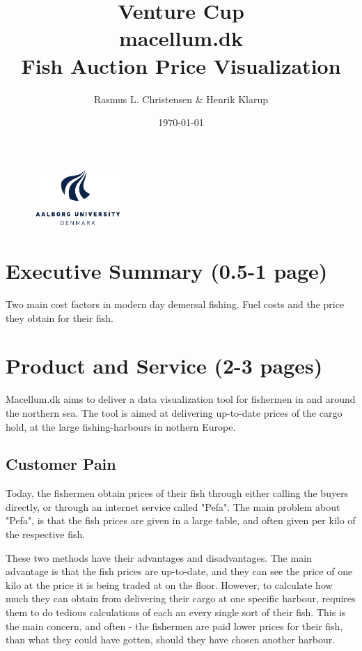 \documentclass[a4paper,10pt,oneside,fleqn]{article}
\begin{document}
\author{Rasmus L. Christensen \& Henrik Klarup}
\title{Venture Cup\\
macellum.dk\\
Fish Auction Price Visualization}
\date{\today}
\maketitle
\begin{centering}
\begin{figure}[htpb]
	\centering
	\includegraphics[width=0.3\textwidth]{aaulogo.pdf}
	\label{fig:aauLOGO}
\end{figure}	
\end{centering}

\cleardoublepage

\tableofcontents

\cleardoublepage

\section{Executive Summary (0.5-1 page)}
Two main cost factors in modern day demersal fishing. Fuel costs and the price they obtain for their fish.

\section{Product and Service (2-3 pages)}
Macellum.dk aims to deliver a data visualization tool for fishermen in and around the northern sea. The tool is aimed at delivering up-to-date prices of the cargo hold, at the large fishing-harbours in nothern Europe. 

\subsection{Customer Pain}
Today, the fishermen obtain prices of their fish through either calling the buyers directly, or through an internet service called "Pefa". The main problem about "Pefa", is that the fish prices are given in a large table, and often given per kilo of the respective fish. 

These two methods have their advantages and disadvantages. The main advantage is that the fish prices are up-to-date, and they can see the price of one kilo at the price it is being traded at on the floor. However, to calculate how much they can obtain from delivering their cargo at one specific harbour, requires them to do tedious calculations of each an every single sort of their fish. This is the main concern, and often - the fishermen are paid lower prices for their fish, than what they could have gotten, should they have chosen another harbour. 
\end{document}
